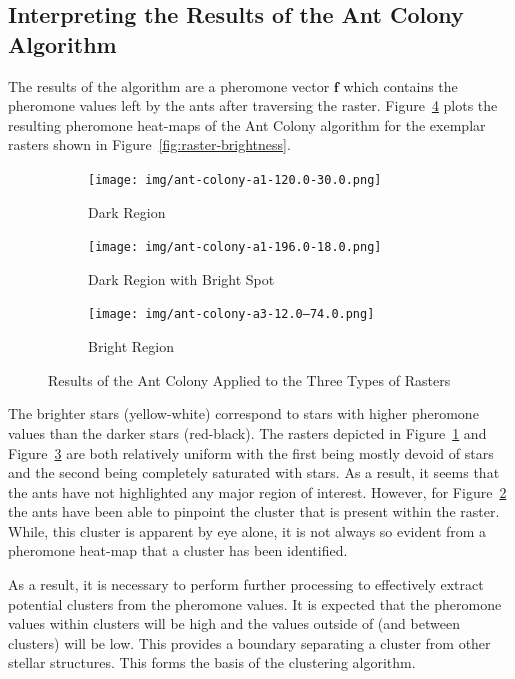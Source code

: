 \subsection{Interpreting the Results of the Ant Colony Algorithm}
The results of the algorithm are a pheromone vector $\mathbf{f}$ which contains the pheromone values left by the ants after traversing the raster. Figure~\ref{fig:ant-colony-raster} plots the resulting pheromone heat-maps of the Ant Colony algorithm for the exemplar rasters shown in Figure~\ref{fig:raster-brightness}.
\begin{figure}[H]
    \centering
    \begin{subfigure}[b]{0.335\textwidth}
        \texttt{[image: img/ant-colony-a1-120.0-30.0.png]}
        \caption{\label{fig:ant-colony-dark-region}Dark Region}
    \end{subfigure}
    \hspace{-0.0225\textwidth}
    \begin{subfigure}[b]{0.335\textwidth}
        \texttt{[image: img/ant-colony-a1-196.0-18.0.png]}
        \caption{\label{fig:ant-colony-one-blob}Dark Region with Bright Spot}
    \end{subfigure}
    \hspace{-0.0225\textwidth}
    \begin{subfigure}[b]{0.335\textwidth}
        \texttt{[image: img/ant-colony-a3-12.0--74.0.png]}
        \caption{\label{fig:ant-colony-bright-region}Bright Region}
    \end{subfigure}
    \caption{\label{fig:ant-colony-raster} Results of the Ant Colony Applied to the Three Types of Rasters}
\end{figure}
\vspace{-1.5em}
The brighter stars (yellow-white) correspond to stars with higher pheromone values than the darker stars (red-black). The rasters depicted in Figure~\ref{fig:ant-colony-dark-region} and Figure~\ref{fig:ant-colony-bright-region} are both relatively uniform with the first being mostly devoid of stars and the second being completely saturated with stars. As a result, it seems that the ants have not highlighted any major region of interest. However, for Figure~\ref{fig:ant-colony-one-blob} the ants have been able to pinpoint the cluster that is present within the raster. While, this cluster is apparent by eye alone, it is not always so evident from a pheromone heat-map that a cluster has been identified.

As a result, it is necessary to perform further processing to effectively extract potential clusters from the pheromone values. It is expected that the pheromone values within clusters will be high and the values outside of (and between clusters) will be low. This provides a boundary separating a cluster from other stellar structures. This forms the basis of the clustering algorithm.

